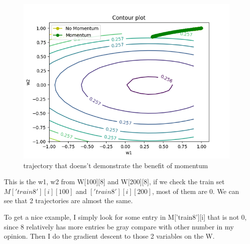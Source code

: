 \documentclass[12pt]{article}
\begin{document}
\begin{figure}[H]
    \includegraphics[width=\textwidth]{report/partbc_contour_bad.png}
    \caption{trajectory that doens't demonstrate the benefit of momentum}
\end{figure}

This is the w1, w2 from W[100][8] and W[200][8], if we check the train set $M['train8'][i][100]$ and $['train8'][i][200]$, most of them are 0. We can see that 2 trajectories are almost the same.

To get a nice example, I simply look for some entry in M['train8'][i] that is not 0, since 8 relatively has more entries be gray compare with other number in my opinion. Then I do the gradient descent to those 2 variables on the W.

\end{document}
